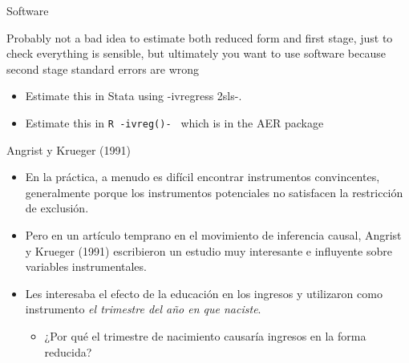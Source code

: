 \documentclass{beamer}
\begin{document}
	
\begin{frame}{Software}

Probably not a bad idea to estimate both reduced form and first stage, just to check everything is sensible, but ultimately you want to use software because second stage standard errors are wrong

\bigskip

\begin{itemize}
	\item Estimate this in Stata using -ivregress 2sls-.
	\item Estimate this in \texttt{R -ivreg()- } which is in the AER package
\end{itemize}

\end{frame}













\begin{frame}{Angrist y Krueger (1991)}
	
	\begin{itemize}
	\item En la práctica, a menudo es difícil encontrar instrumentos convincentes, generalmente porque los instrumentos potenciales no satisfacen la restricción de exclusión.
	\item Pero en un artículo temprano en el movimiento de inferencia causal, Angrist y Krueger (1991) escribieron un estudio muy interesante e influyente sobre variables instrumentales.
	\item Les interesaba el efecto de la educación en los ingresos y utilizaron como instrumento \emph{el trimestre del año en que naciste}.
    \begin{itemize}
        \item ¿Por qué el trimestre de nacimiento causaría ingresos en la forma reducida?
    \end{itemize}
	\end{itemize}
	
\end{frame}
\end{document}
